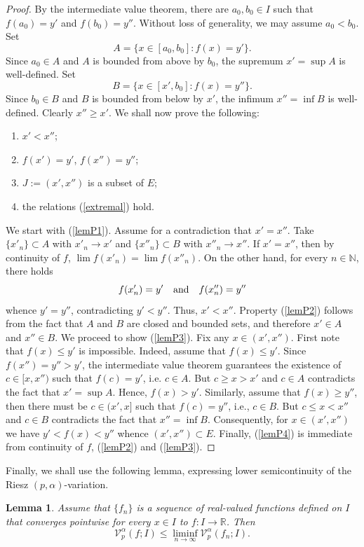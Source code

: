\documentclass{amsart}
\newtheorem{lem}[theorem]{Lemma}
\numberwithin{equation}{section}
\begin{document}
\begin{proof}
    By the intermediate value theorem, there are $a_0,b_0\in I$ such that $f(a_0)=y'$ and $f(b_0)=y''$. Without loss of generality, we may assume $a_0<b_0$. Set
    $$
        A=\{x\in[a_0,b_0]:f(x)=y'\}.
    $$
    Since $a_0\in A$ and $A$ is bounded from above by $b_0$, the supremum $x'=\sup A$ is well-defined. Set
    $$
        B=\{x\in[x',b_0]:f(x)=y''\}.
    $$
    Since $b_0\in B$ and $B$ is bounded from below by $x'$, the infimum $x''=\inf B$ is well-defined. Clearly $x''\ge x'$. We shall now prove the following:
    \begin{enumerate}
        \item\label{lemP1} $x'<x''$;
        \item\label{lemP2} $f(x')=y'$, $f(x'')=y''$;
        \item\label{lemP3} $J:=(x',x'')$ is a subset of $E$;
        \item\label{lemP4} the relations (\ref{extremal}) hold.
    \end{enumerate}
    We start with (\ref{lemP1}). Assume for a contradiction that $x'=x''$. Take $\{x'_n\}\subset A$ with $x'_n\rightarrow x'$ and $\{x''_n\}\subset B$ with $x''_n\rightarrow x''$. If $x'=x''$, then by continuity of $f$, $\lim f(x'_n)=\lim f(x''_n)$. On the other hand, for every $n\in\mathbb{N}$, there holds
    $$
    f(x'_n)=y'\quad{\rm and}\quad f(x''_n)=y''
    $$
    whence $y'=y''$, contradicting $y'<y''$. Thus, $x'<x''$. Property (\ref{lemP2}) follows from the fact that $A$ and $B$ are closed and bounded sets, and therefore $x'\in A$ and $x''\in B$. 
    We proceed to show (\ref{lemP3}). Fix any $x\in(x',x'')$. First note that $f(x)\le y'$ is impossible. Indeed, assume that $f(x)\le y'$.
    Since $f(x'')=y''>y'$, the intermediate value theorem guarantees the existence of $c\in[x,x'')$ such that $f(c)=y'$, i.e. $c\in A$. But $c\ge x>x'$ and $c\in A$ contradicts the fact that $x'=\sup A$. Hence, $f(x)>y'$.
    Similarly, assume that $f(x)\ge y''$, then there must be $c\in(x',x]$ such that $f(c)=y''$, i.e., $c\in B$. But $c\le x< x''$ and $c\in B$ contradicts the fact that $x''=\inf B$. Consequently, for $x\in(x',x'')$ we have $y'<f(x)<y''$ whence $(x',x'')\subset E$.
    Finally, (\ref{lemP4}) is immediate from continuity of $f$, (\ref{lemP2}) and (\ref{lemP3}).
\end{proof}
Finally, we shall use the following lemma, expressing lower semicontinuity of the Riesz $(p,\alpha)$-variation.
\begin{lem}
    \label{semicontinuityLem}
    Assume that $\{f_n\}$ is a sequence of real-valued functions defined on $I$ that converges pointwise for every $x\in I$ to $f:I\rightarrow\mathbb{R}$. Then
    \begin{equation}
        \label{semicontinuity}
        \mathcal{V}^\alpha_p(f;I)\le\liminf_{n\rightarrow\infty}\mathcal{V}_p^\alpha(f_n;I).
    \end{equation}
\end{lem}
\end{document}
